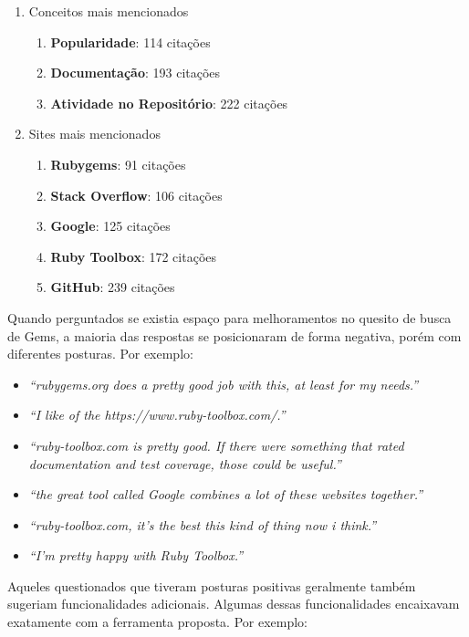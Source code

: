 \begin{enumerate}
	\item Conceitos mais mencionados
	    \begin{enumerate}
	        \item \textbf{Popularidade}: 114 citações
			\item \textbf{Documentação}: 193 citações    	
    		\item \textbf{Atividade no Repositório}: 222 citações
        \end{enumerate}
   	\item Sites mais mencionados
      	\begin{enumerate}
        	\item \textbf{Rubygems}: 91 citações
            \item \textbf{Stack Overflow}: 106 citações
		    \item \textbf{Google}: 125 citações
		    \item \textbf{Ruby Toolbox}: 172 citações
            \item \textbf{GitHub}: 239 citações
	    \end{enumerate}
\end{enumerate}

Quando perguntados se existia espaço para melhoramentos no quesito de busca de Gems, a maioria das respostas se posicionaram de forma negativa, porém com diferentes posturas. Por exemplo:

\begin{itemize}
	\item \textit{``rubygems.org does a pretty good job with this, at least for my needs.''}
    \item \textit{``I like of the https://www.ruby-toolbox.com/.''}
    \item \textit{``ruby-toolbox.com is pretty good. If there were something that rated documentation and test coverage, those could be useful.''}
    \item \textit{``the great tool called Google combines a lot of these websites together.''}
    \item \textit{``ruby-toolbox.com, it's the best this kind of thing now i think.''}
    \item \textit{``I'm pretty happy with Ruby Toolbox.''}
\end{itemize}

Aqueles questionados que tiveram posturas positivas geralmente também sugeriam funcionalidades adicionais. Algumas dessas funcionalidades encaixavam exatamente com a ferramenta proposta. Por exemplo:

